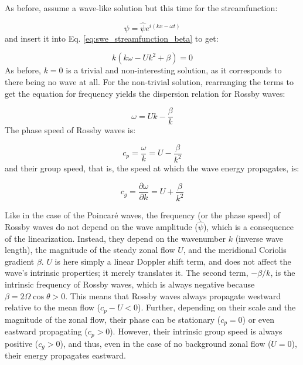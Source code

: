 \documentclass[12pt]{article}
\numberwithin{equation}{section}
\numberwithin{figure}{section}
\numberwithin{table}{section}
\begin{document}
As before, assume a wave-like solution but this time for the streamfunction:

\begin{equation}
  \psi = \widehat{\psi} e^{i(kx - \omega t)}
\end{equation}
and insert it into Eq. \ref{eq:swe_streamfunction_beta} to get:

\begin{equation}
  k \left( k\omega - Uk^2 + \beta \right) = 0
\end{equation}
As before, $k = 0$ is a trivial and non-interesting solution, as it corresponds
to there being no wave at all.
For the non-trivial solution, rearranging the terms to get the equation for
frequency yields the dispersion relation for Rossby waves:

\begin{equation}
  \omega = U k - \frac{\beta}{k}
  \label{eq:swe_rossby_wave_dispersion_1d}
\end{equation}
The phase speed of Rossby waves is:

\begin{equation}
  c_p = \frac{\omega}{k} = U - \frac{\beta}{k^2}
  \label{eq:swe_rossby_wave_phase_speed_1d}
\end{equation}
and their group speed, that is, the speed at which the wave energy propagates,
is:

\begin{equation}
  c_g = \frac{\partial\omega}{\partial k} = U + \frac{\beta}{k^2}
  \label{eq:swe_rossby_wave_group_speed_1d}
\end{equation}

Like in the case of the Poincaré waves, the frequency (or the phase speed) of
Rossby waves do not depend on the wave amplitude ($\widehat{\psi}$), which is a
consequence of the linearization.
Instead, they depend on the wavenumber $k$ (inverse wave length), the magnitude
of the steady zonal flow $U$, and the meridional Coriolis gradient $\beta$.
$U$ is here simply a linear Doppler shift term, and does not affect the
wave's intrinsic properties; it merely translates it.
The second term, $-\beta/k$, is the intrinsic frequency of Rossby waves,
which is always negative because $\beta = 2\Omega \cos{\theta} > 0$.
This means that Rossby waves always propagate westward relative to the mean flow
($c_p - U < 0$).
Further, depending on their scale and the magnitude of the zonal flow, their
phase can be stationary ($c_p = 0$) or even eastward propagating ($c_p > 0$).
However, their intrinsic group speed is always positive ($c_g > 0$), and thus,
even in the case of no background zonal flow ($U=0$), their energy propagates
eastward.
\end{document}
